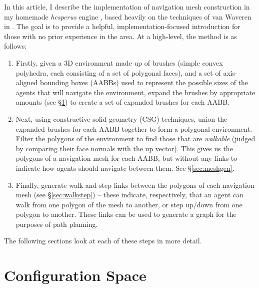 \documentclass[10pt,twocolumn]{article}
\begin{document}
In this article, I describe the implementation of navigation mesh construction in my homemade \emph{hesperus} engine \cite{hesperus}, based heavily on the techniques of van Waveren in \cite{vanwaveren01}. The goal is to provide a helpful, implementation-focused introduction for those with no prior experience in the area. At a high-level, the method is as follows:
%
\begin{enumerate}
\item Firstly, given a 3D environment made up of brushes (simple convex polyhedra, each consisting of a set of polygonal faces), and a set of axis-aligned bounding boxes (AABBs) used to represent the possible sizes of the agents that will navigate the environment, expand the brushes by appropriate amounts (see \S\ref{sec:configspace}) to create a set of expanded brushes for each AABB.
\item Next, using constructive solid geometry (CSG) techniques, union the expanded brushes for each AABB together to form a polygonal environment. Filter the polygons of the environment to find those that are \emph{walkable} (judged by comparing their face normals with the up vector). This gives us the polygons of a navigation mesh for each AABB, but without any links to indicate how agents should navigate between them. See \S\ref{sec:meshgen}.
\item Finally, generate walk and step links between the polygons of each navigation mesh (see \S\ref{sec:walkstep}) -- these indicate, respectively, that an agent can walk from one polygon of the mesh to another, or step up/down from one polygon to another. These links can be used to generate a graph for the purposes of path planning.
\end{enumerate}
%
The following sections look at each of these steps in more detail.

\section{Configuration Space}
\label{sec:configspace}
\end{document}
